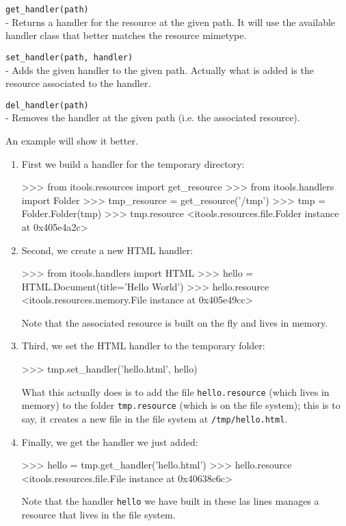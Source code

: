 \begin{api}
  {\tt get\_handler(path)}\\
  - Returns a handler for the resource at the given path. It will use the
    available handler class that better matches the resource mimetype.

  {\tt set\_handler(path, handler)}\\
  - Adds the given handler to the given path. Actually what is added is
    the resource associated to the handler.

  {\tt del\_handler(path)}\\
  - Removes the handler at the given path (i.e. the associated resource).
\end{api}

An example will show it better.

\begin{enumerate}
  \item First we build a handler for the temporary directory:

\begin{code}
    >>> from itools.resources import get_resource
    >>> from itools.handlers import Folder
    >>> tmp_resource = get_resource('/tmp')
    >>> tmp = Folder.Folder(tmp)
    >>> tmp.resource
    <itools.resources.file.Folder instance at 0x405e4a2c>
\end{code}

  \item Second, we create a new HTML handler:

\begin{code}
    >>> from itools.handlers import HTML
    >>> hello = HTML.Document(title='Hello World')
    >>> hello.resource
    <itools.resources.memory.File instance at 0x405e49cc>
\end{code}

    Note that the associated resource is built on the fly and lives in memory.

  \item Third, we set the HTML handler to the temporary folder:

\begin{code}
    >>> tmp.set_handler('hello.html', hello)
\end{code}

    What this actually does is to add the file {\tt hello.resource} (which
    lives in memory) to the folder {\tt tmp.resource} (which is on the
    file system); this is to say, it creates a new file in the file system
    at {\tt /tmp/hello.html}.

  \item Finally, we get the handler we just added:

\begin{code}
    >>> hello = tmp.get_handler('hello.html')
    >>> hello.resource
    <itools.resources.file.File instance at 0x40638c6c>
\end{code}

    Note that the handler {\tt hello} we have built in these las lines
    manages a resource that lives in the file system.

\end{enumerate}



